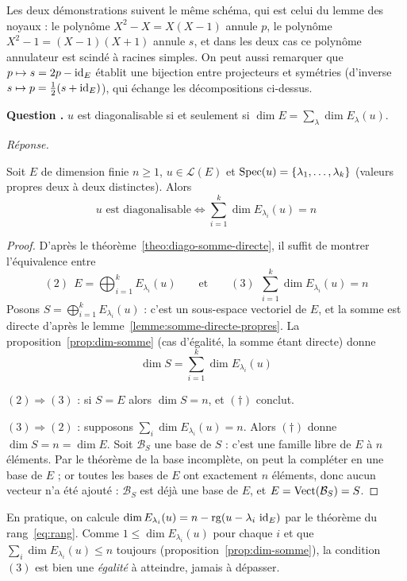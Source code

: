 \documentclass[11pt]{article}
\newcounter{qnum}
\newcommand{\question}[1]{%
\stepcounter{qnum}%
\bigskip
\noindent\textbf{Question \theqnum.} #1\par}
\newcommand{\reponse}{\noindent\textit{Réponse.}\ }
\begin{document}
\begin{remarque}
Les deux démonstrations suivent le même schéma, qui est celui du lemme des noyaux : le polynôme $X^2-X=X(X-1)$ annule $p$, le polynôme $X^2-1=(X-1)(X+1)$ annule $s$, et dans les deux cas ce polynôme annulateur est scindé à racines simples. On peut aussi remarquer que $p\mapsto s=2p-\operatorname{id}_E$ établit une bijection entre projecteurs et symétries (d'inverse $s\mapsto p=\frac12(s+\operatorname{id}_E)$), qui échange les décompositions ci-dessus.
\end{remarque}

\question{$u$ est diagonalisable si et seulement si $\dim E=\sum_{\lambda}\dim E_\lambda(u)$.}
\reponse

\begin{theo}
\label{theo:diago-dim}
Soit $E$ de dimension finie $n\geq 1$, $u\in\mathcal{L}(E)$ et $\operatorname{Spec}(u)=\{\lambda_1,\dots,\lambda_k\}$ (valeurs propres deux à deux distinctes). Alors
\[u \text{ est diagonalisable} \iff \sum_{i=1}^{k}\dim E_{\lambda_i}(u) = n\]
\end{theo}

\begin{proof}
D'après le théorème~\ref{theo:diago-somme-directe}, il suffit de montrer l'équivalence entre
\[(2)\ \ E=\bigoplus_{i=1}^{k}E_{\lambda_i}(u) \qquad\text{et}\qquad (3)\ \ \sum_{i=1}^{k}\dim E_{\lambda_i}(u)=n\]
Posons $S=\bigoplus_{i=1}^{k}E_{\lambda_i}(u)$ : c'est un sous-espace vectoriel de $E$, et la somme est directe d'après le lemme~\ref{lemme:somme-directe-propres}. La proposition~\ref{prop:dim-somme} (cas d'égalité, la somme étant directe) donne
\[\dim S = \sum_{i=1}^{k}\dim E_{\lambda_i}(u) \tag{$\dagger$}\]

$(2)\Rightarrow(3)$ : si $S=E$ alors $\dim S=n$, et $(\dagger)$ conclut.

$(3)\Rightarrow(2)$ : supposons $\sum_{i}\dim E_{\lambda_i}(u)=n$. Alors $(\dagger)$ donne $\dim S=n=\dim E$. Soit $\mathcal{B}_S$ une base de $S$ : c'est une famille libre de $E$ à $n$ éléments. Par le théorème de la base incomplète, on peut la compléter en une base de $E$ ; or toutes les bases de $E$ ont exactement $n$ éléments, donc aucun vecteur n'a été ajouté : $\mathcal{B}_S$ est déjà une base de $E$, et $E=\operatorname{Vect}(\mathcal{B}_S)=S$.
\end{proof}

\begin{remarque}
En pratique, on calcule $\dim E_{\lambda_i}(u)=n-\operatorname{rg}(u-\lambda_i\,\operatorname{id}_E)$ par le théorème du rang~\eqref{eq:rang}. Comme $1\leq\dim E_{\lambda_i}(u)$ pour chaque $i$ et que $\sum_i\dim E_{\lambda_i}(u)\leq n$ toujours (proposition~\ref{prop:dim-somme}), la condition $(3)$ est bien une \emph{égalité} à atteindre, jamais à dépasser.
\end{remarque}
\end{document}
